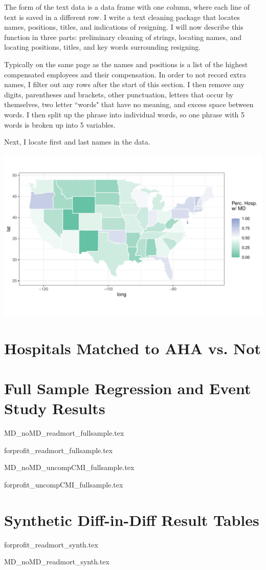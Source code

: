 \documentclass[12pt]{article}
\begin{document}
The form of the text data is a data frame with one column, where each line of text is saved in a different row. I write a text cleaning package that locates names, positions, titles, and indications of resigning. I will now describe this function in three parts: preliminary cleaning of strings, locating names, and locating positions, titles, and key words surrounding resigning. 

Typically on the same page as the names and positions is a list of the highest compensated employees and their compensation. In order to not record extra names, I filter out any rows after the start of this section. I then remove any digits, parentheses and brackets, other punctuation, letters that occur by themselves, two letter ``words" that have no meaning, and excess space between words. I then split up the phrase into individual words, so one phrase with 5 words is broken up into 5 variables. 

Next, I locate first and last names in the data. 

\includegraphics[width=\textwidth]{Objects/has_doc_avg_map.pdf}


\section{Hospitals Matched to AHA vs. Not}\label{app:matched}

\section{Full Sample Regression and Event Study Results}\label{app:fullsample}

{MD_noMD_readmort_fullsample.tex}

{forprofit_readmort_fullsample.tex}

{MD_noMD_uncompCMI_fullsample.tex}

{forprofit_uncompCMI_fullsample.tex}

\section{Synthetic Diff-in-Diff Result Tables}

{forprofit_readmort_synth.tex}

{MD_noMD_readmort_synth.tex}


    

    

    

    

    

    

	
	
	
\end{document}
